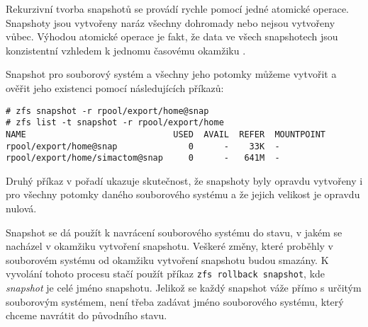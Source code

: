 Rekurzivní tvorba snapshotů se provádí rychle pomocí jedné atomické operace. Snapshoty jsou vytvořeny naráz všechny dohromady nebo nejsou vytvořeny vůbec. Výhodou atomické operace je fakt, že data ve všech snapshotech jsou konzistentní vzhledem k jednomu časovému okamžiku \cite{snapshot}.

Snapshot pro souborový systém a všechny jeho potomky můžeme vytvořit a ověřit jeho existenci pomocí následujících příkazů:
\begin{verbatim}
# zfs snapshot -r rpool/export/home@snap
# zfs list -t snapshot -r rpool/export/home
NAME                             USED  AVAIL  REFER  MOUNTPOINT
rpool/export/home@snap              0      -    33K  -
rpool/export/home/simactom@snap     0      -   641M  -
\end{verbatim}
Druhý příkaz v pořadí ukazuje skutečnost, že snapshoty byly opravdu vytvořeny i pro všechny potomky daného souborového systému a že jejich velikost je opravdu nulová.

Snapshot se dá použít k navrácení souborového systému do stavu, v jakém se nacházel v okamžiku vytvoření snapshotu. Veškeré změny, které proběhly v souborovém systému od okamžiku vytvoření snapshotu budou smazány. K vyvolání tohoto procesu stačí použít příkaz \verb|zfs rollback snapshot|, kde \emph{snapshot} je celé jméno snapshotu. Jelikož se každý snapshot váže přímo s určitým souborovým systémem, není třeba zadávat jméno souborového systému, který chceme navrátit do původního stavu. 